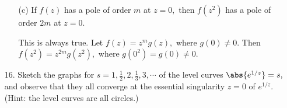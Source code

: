\documentclass{article}
\begin{document}
\begin{itemize}
\begin{itemize}
			\item[(c)] If $f(z)$ has a pole of order $m$ at $z=0,$ then $f(z^2)$ has a pole of order $2m$ at $z=0.$
				\begin{answer*}
					This is always true. Let $f(z)=z^m g(z),$ where $g(0)\neq 0.$ Then $f(z^2)=z^{2m} g(z^2),$ where $g(0^2)=g(0)\neq 0.$
				\end{answer*}
				
		\end{itemize}

	\item[16.] Sketch the graphs for $s=1, \frac{1}{2}, 2, \frac{1}{3}, 3, \cdots$ of the level curves $\abs{e^{1/z}}=s,$ and observe that they all converge at the essential singularity $z=0$ of $e^{1/z}.$ (Hint: the level curves are all circles.)
		
\end{itemize}
\end{document}
